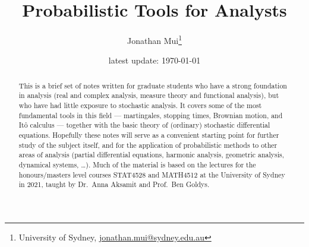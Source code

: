 \documentclass[11pt]{article}
\title{\bf Probabilistic Tools for Analysts}
\author{Jonathan Mui\footnote{University of Sydney, \href{mailto:jonathan.mui@sydney.edu.au}{jonathan.mui@sydney.edu.au}}}
\date{latest update: \today}
\numberwithin{equation}{section}
\theoremstyle{plain}
\theoremstyle{definition}
\begin{document}
\maketitle

\begin{abstract}
    This is a brief set of notes written for graduate students who have a strong foundation in analysis (real and complex analysis, measure theory and functional analysis), but who have had little exposure to stochastic analysis. It covers some of the most fundamental tools in this field --- martingales, stopping times, Brownian motion, and It\^{o} calculus --- together with the basic theory of (ordinary) stochastic differential equations. Hopefully these notes will serve as a convenient starting point for further study of the subject itself, and for the application of probabilistic methods to other areas of analysis (partial differential equations, harmonic analysis, geometric analysis, dynamical systems, \ldots). Much of the material is based on the lectures for the honours/masters level courses STAT4528 and MATH4512 at the University of Sydney in 2021, taught by Dr.\ Anna Aksamit and Prof.\ Ben Goldys.
\end{abstract}

\tableofcontents















%

\nocite{*}


\end{document}
